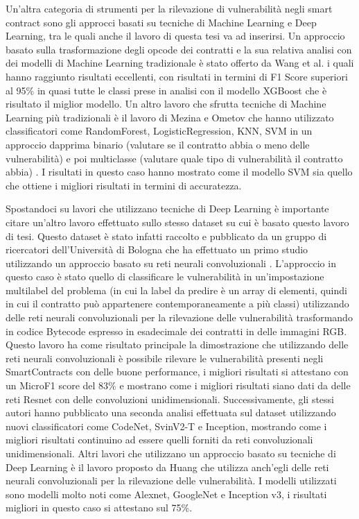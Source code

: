 \documentclass[../../Thesis.tex]{subfiles}
\begin{document}
Un'altra categoria di strumenti per la rilevazione di vulnerabilità negli smart contract sono gli approcci basati su tecniche di Machine Learning e Deep Learning, tra le quali anche il lavoro di questa tesi va ad inserirsi. Un approccio basato sulla trasformazione degli opcode dei contratti e la sua relativa analisi con dei modelli di Machine Learning tradizionale è stato offerto da Wang et al. \cite{ContractWard} i quali hanno raggiunto risultati eccellenti, con risultati in termini di F1 Score superiori al 95\% in quasi tutte le classi prese in analisi con il modello XGBoost che è risultato il miglior modello. Un altro lavoro che sfrutta tecniche di Machine Learning più tradizionali è il lavoro di Mezina e Ometov che hanno utilizzato classificatori come RandomForest, LogisticRegression, KNN, SVM in un approccio dapprima binario (valutare se il contratto abbia o meno delle vulnerabilità) e poi multiclasse (valutare quale tipo di vulnerabilità il contratto abbia) \cite{Mezina}. I risultati in questo caso hanno mostrato come il modello SVM sia quello che ottiene i migliori risultati in termini di accuratezza. 

Spostandoci su lavori che utilizzano tecniche di Deep Learning è importante citare un'altro lavoro effettuato sullo stesso dataset su cui è basato questo lavoro di tesi. Questo dataset è stato infatti raccolto e pubblicato da un gruppo di ricercatori dell'Università di Bologna che ha effettuato un primo studio utilizzando un approccio basato su reti neurali convoluzionali \cite{RossiniPaper1}. L'approccio in questo caso è stato quello di classificare le vulnerabilità in un'impostazione multilabel del problema (in cui la label da predire è un array di elementi, quindi in cui il contratto può appartenere contemporaneamente a più classi) utilizzando delle reti neurali convoluzionali per la rilevazione delle vulnerabilità trasformando in codice Bytecode espresso in esadecimale dei contratti in delle immagini RGB. Questo lavoro ha  come risultato principale la dimostrazione che utilizzando delle reti neurali convoluzionali è possibile rilevare le vulnerabilità presenti negli SmartContracts con delle buone performance, i migliori risultati si attestano con un MicroF1 score del 83\% e mostrano come i migliori risultati siano dati da delle reti Resnet con delle convoluzioni unidimensionali. Successivamente, gli stessi autori hanno pubblicato una seconda analisi effettuata sul dataset utilizzando nuovi classificatori come CodeNet, SvinV2-T e Inception, mostrando come i migliori risultati  continuino ad essere quelli forniti da reti convoluzionali unidimensionali. Altri lavori che utilizzano un approccio basato su tecniche di Deep Learning è il lavoro proposto da Huang \cite{Huang} che utilizza anch'egli delle reti neurali convoluzionali per la rilevazione delle vulnerabilità. I modelli utilizzati sono modelli molto noti come Alexnet, GoogleNet e Inception v3, i risultati migliori in questo caso si attestano sul 75\%.
\end{document}
